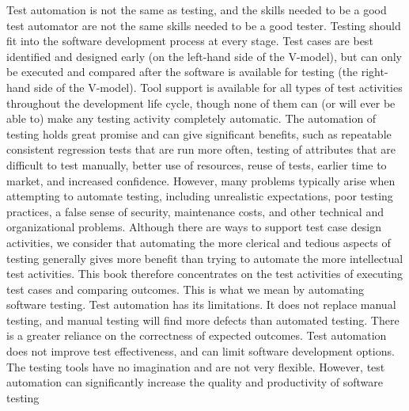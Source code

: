 Test automation is not the same as testing, and the skills needed to be a
good test automator are not the same skills needed to be a good tester.
Testing should fit into the software development process at every stage.
Test cases are best identified and designed early (on the left-hand side of the
V-model), but can only be executed and compared after the software is
available for testing (the right-hand side of the V-model).
Tool support is available for all types of test activities throughout the
development life cycle, though none of them can (or will ever be able to)
make any testing activity completely automatic.
The automation of testing holds great promise and can give significant
benefits, such as repeatable consistent regression tests that are run more
often, testing of attributes that are difficult to test manually, better use of
resources, reuse of tests, earlier time to market, and increased confidence.
However, many problems typically arise when attempting to automate testing,
including unrealistic expectations, poor testing practices, a false sense of
security, maintenance costs, and other technical and organizational problems.
Although there are ways to support test case design activities, we consider
that automating the more clerical and tedious aspects of testing
generally gives more benefit than trying to automate the more intellectual
test activities. This book therefore concentrates on the test activities of executing
test cases and comparing outcomes. This is what we mean by
automating software testing.
Test automation has its limitations. It does not replace manual testing, and
manual testing will find more defects than automated testing. There is a
greater reliance on the correctness of expected outcomes. Test automation
does not improve test effectiveness, and can limit software development
options. The testing tools have no imagination and are not very flexible.
However, test automation can significantly increase the quality and productivity
of software testing